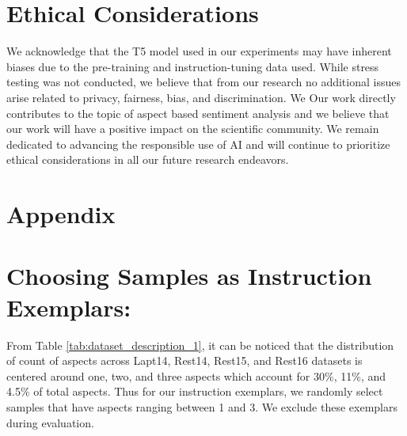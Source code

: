 \documentclass[11pt]{article}
\begin{document}
\section*{Ethical Considerations}
We acknowledge that the T5 model used in our experiments may have inherent biases due to the pre-training and instruction-tuning data used. 
While stress testing was not conducted, we believe that from our research no additional issues arise related to privacy, fairness, bias, and discrimination.
We 
Our work directly contributes to the topic of aspect based sentiment analysis and we believe that our work will have a positive impact on the scientific community. 
We remain dedicated to advancing the responsible use of AI and will continue to prioritize ethical considerations in all our future research endeavors. 





\clearpage

\section*{Appendix}
\appendix

\section{Choosing Samples as Instruction Exemplars:} 
From Table \ref{tab:dataset_description_1}, it can be noticed that the distribution of count of aspects across Lapt14, Rest14, Rest15, and Rest16 datasets is centered around one, two, and three aspects which account for 30\%, 11\%, and 4.5\% of total aspects. 
Thus for our instruction exemplars, we randomly select samples that have aspects ranging between 1 and 3. 
We exclude these exemplars during evaluation.
\end{document}
